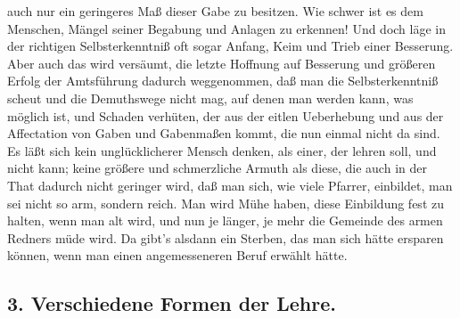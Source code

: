 auch nur ein geringeres Maß dieser Gabe zu besitzen. Wie schwer ist es dem Menschen, Mängel seiner Begabung und Anlagen zu erkennen! Und doch läge in der richtigen Selbsterkenntniß oft sogar Anfang, Keim und Trieb einer Besserung. Aber auch das wird versäumt, die letzte Hoffnung auf Besserung und größeren Erfolg der Amtsführung dadurch weggenommen, daß man die Selbsterkenntniß scheut und die Demuthswege nicht mag, auf denen man werden kann, was möglich ist, und Schaden verhüten, der aus der eitlen Ueberhebung und aus der Affectation von Gaben und Gabenmaßen kommt, die nun einmal nicht da sind. Es läßt sich kein unglücklicherer Mensch denken, als einer, der lehren soll, und nicht kann; keine größere und schmerzliche Armuth als diese, die auch in der That dadurch nicht geringer wird, daß man sich, wie viele Pfarrer, einbildet, man sei nicht so arm, sondern reich. Man wird Mühe haben, diese Einbildung fest zu halten, wenn man alt wird, und nun je länger, je mehr die Gemeinde des armen Redners müde wird. Da gibt's alsdann ein Sterben, das man sich hätte ersparen können, wenn man einen angemesseneren Beruf erwählt hätte.

\subsection*{3. Verschiedene Formen der Lehre.}

